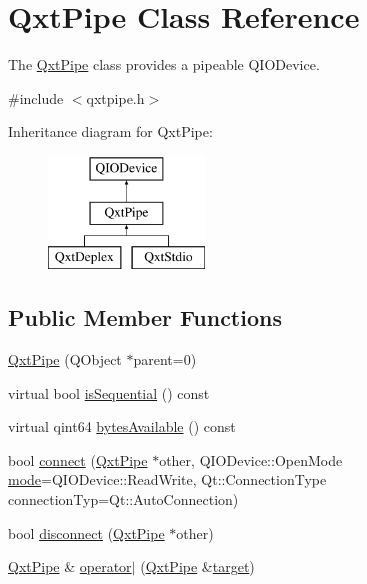 \hypertarget{class_qxt_pipe}{\section{Qxt\-Pipe Class Reference}
\label{class_qxt_pipe}
}


The \hyperlink{class_qxt_pipe}{Qxt\-Pipe} class provides a pipeable Q\-I\-O\-Device.  




{\ttfamily \#include $<$qxtpipe.\-h$>$}

Inheritance diagram for Qxt\-Pipe\-:\begin{figure}[H]
\begin{center}
\leavevmode
\includegraphics[height=3.000000cm]{class_qxt_pipe}
\end{center}
\end{figure}
\subsection*{Public Member Functions}
\begin{DoxyCompactItemize}
\item 
\hyperlink{class_qxt_pipe_aecb1af8e53eceb7329606520ea012efc}{Qxt\-Pipe} (Q\-Object $\ast$parent=0)
\item 
virtual bool \hyperlink{class_qxt_pipe_a661dfeba94c4e4a53e5eda3f014de56b}{is\-Sequential} () const 
\item 
virtual qint64 \hyperlink{class_qxt_pipe_a6a812cb9a8b97136159367b3afa0d698}{bytes\-Available} () const 
\item 
bool \hyperlink{class_qxt_pipe_a0666edfec8e321db742b1db943fae486}{connect} (\hyperlink{class_qxt_pipe}{Qxt\-Pipe} $\ast$other, Q\-I\-O\-Device\-::\-Open\-Mode \hyperlink{glext_8h_a1e71d9c196e4683cc06c4b54d53f7ef5}{mode}=Q\-I\-O\-Device\-::\-Read\-Write, Qt\-::\-Connection\-Type connection\-Typ=Qt\-::\-Auto\-Connection)
\item 
bool \hyperlink{class_qxt_pipe_a46272022ea1afac8c01f0143256069af}{disconnect} (\hyperlink{class_qxt_pipe}{Qxt\-Pipe} $\ast$other)
\item 
\hyperlink{class_qxt_pipe}{Qxt\-Pipe} \& \hyperlink{class_qxt_pipe_a1c459857a3f24f5ea404d72342abd87d}{operator$|$} (\hyperlink{class_qxt_pipe}{Qxt\-Pipe} \&\hyperlink{glext_8h_af9d0cbbbeb7414e786c41899e5a856d7}{target})
\end{DoxyCompactItemize}
